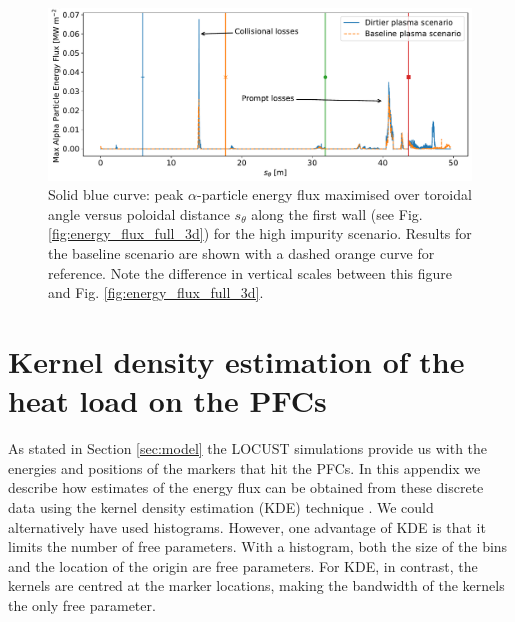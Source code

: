 \documentclass[10pt, a4paper, twoside]{article}
\begin{document}
\begin{figure}[!ht]
    \centering
    \includegraphics[width=0.99\linewidth]{Figures/energy_flux_spr_045_14_vs_spr_045_16.pdf}
    \caption{Solid blue curve: peak $\alpha$-particle energy flux maximised over toroidal angle versus poloidal distance $s_{\theta}$ along the first wall (see Fig. \ref{fig:energy_flux_full_3d}) for the high impurity scenario. Results for the baseline scenario are shown with a dashed orange curve for reference. Note the difference in vertical scales between this figure and Fig. \ref{fig:energy_flux_full_3d}.}
    \label{fig:energy_flux_spr_045_14_vs_spr_045_16}
\end{figure}


\newpage
\section{Kernel density estimation of the heat load on the PFCs}
\label{appendix:kernel_density_estimation}

As stated in Section \ref{sec:model} the LOCUST simulations provide us with the energies and positions of the markers that hit the PFCs. In this appendix we describe how estimates of the energy flux can be obtained from these discrete data using the kernel density estimation (KDE) technique \cite{chen2017}. We could alternatively have used histograms. However, one advantage of KDE is that it limits the number of free parameters. With a histogram, both the size of the bins and the location of the origin are free parameters. For KDE, in contrast, the kernels are centred at the marker locations, making the bandwidth of the kernels the only free parameter.
\end{document}
